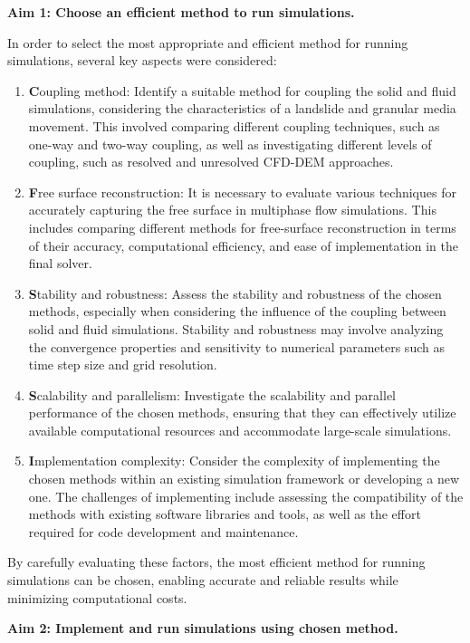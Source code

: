 \textbf{Aim 1: Choose an efficient method to run simulations.}

In order to select the most appropriate and efficient method for running simulations, several key aspects were considered:
\begin{enumerate}
    \item {\textbf Coupling method:} Identify a suitable method for coupling the solid and fluid simulations, considering the characteristics of a landslide and granular media movement. This involved comparing different coupling techniques, such as one-way and two-way coupling, as well as investigating different levels of coupling, such as resolved and unresolved CFD-DEM approaches.
    \item {\textbf Free surface reconstruction:} It is necessary to evaluate various techniques for accurately capturing the free surface in multiphase flow simulations. This includes comparing different methods for free-surface reconstruction in terms of their accuracy, computational efficiency, and ease of implementation in the final solver.
    \item {\textbf Stability and robustness:} Assess the stability and robustness of the chosen methods, especially when considering the influence of the coupling between solid and fluid simulations. Stability and robustness may involve analyzing the convergence properties and sensitivity to numerical parameters such as time step size and grid resolution.
    \item {\textbf Scalability and parallelism:} Investigate the scalability and parallel performance of the chosen methods, ensuring that they can effectively utilize available computational resources and accommodate large-scale simulations.
    \item {\textbf Implementation complexity:} Consider the complexity of implementing the chosen methods within an existing simulation framework or developing a new one. The challenges of implementing include assessing the compatibility of the methods with existing software libraries and tools, as well as the effort required for code development and maintenance.
\end{enumerate}

By carefully evaluating these factors, the most efficient method for running simulations can be chosen, enabling accurate and reliable results while minimizing computational costs.

\textbf{Aim 2: Implement and run simulations using chosen method.} 


